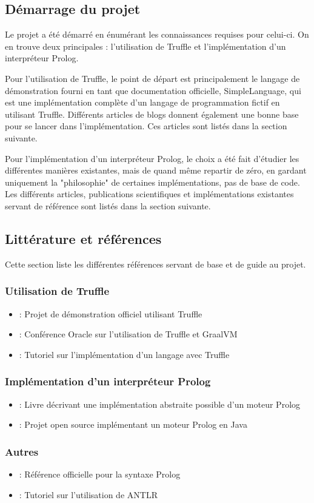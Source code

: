 \documentclass[../report.tex]{subfiles}
\begin{document}
\subsection{Démarrage du projet}
Le projet a été démarré en énumérant les connaissances requises pour celui-ci. On en trouve deux principales : l'utilisation de Truffle et l'implémentation d'un interpréteur Prolog.

Pour l'utilisation de Truffle, le point de départ est principalement le langage de démonstration fourni en tant que documentation officielle, SimpleLanguage, qui est une implémentation complète d'un langage de programmation fictif en utilisant Truffle. Différents articles de blogs donnent également une bonne base pour se lancer dans l'implémentation. Ces articles sont listés dans la section suivante.

Pour l'implémentation d'un interpréteur Prolog, le choix a été fait d'étudier les différentes manières existantes, mais de quand même repartir de zéro, en gardant uniquement la "philosophie" de certaines implémentations, pas de base de code. Les différents articles, publications scientifiques et implémentations existantes servant de référence sont listés dans la section suivante.
\subsection{Littérature et références}
Cette section liste les différentes références servant de base et de guide au projet.
\subsubsection{Utilisation de Truffle}
\begin{itemize}
    \item \cite{SimpleLanguage} : Projet de démonstration officiel utilisant Truffle
    \item \cite{OneVM} : Conférence Oracle sur l'utilisation de Truffle et GraalVM
    \item \cite{WritingTruffle} : Tutoriel sur l'implémentation d'un langage avec Truffle
\end{itemize}
\subsubsection{Implémentation d'un interpréteur Prolog}
\begin{itemize}
    \item \cite{WarrenAM} : Livre décrivant une implémentation abstraite possible d'un moteur Prolog
    \item \cite{JIProlog} : Projet open source implémentant un moteur Prolog en Java
\end{itemize}
\subsubsection{Autres}
\begin{itemize}
    \item \cite{PrologSyntax} : Référence officielle pour la syntaxe Prolog
    \item \cite{ANTLRTutorial} : Tutoriel sur l'utilisation de ANTLR
\end{itemize}
\end{document}
